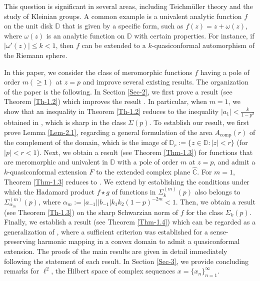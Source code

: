 \documentclass[a4paper,12pt]{amsart}
\theoremstyle{plain}
\theoremstyle{definition}
\begin{document}
This question is significant in several areas, including Teichm\"uller theory and the study of Kleinian groups. A common example is a univalent analytic function $f$ on the unit disk $\mathbb{D}$ that is given by a specific form, such as $f(z) = z + \omega(z)$, where $\omega(z)$ is an analytic function on $\mathbb{D}$ with certain properties. For instance, if $|\omega'(z)| \leq k < 1$, then $f$ can be extended to a $k$-quasiconformal automorphism of the Riemann sphere.\vspace{1.2mm}

In this paper, we consider the class of meromorphic functions $f$ having a pole of order $m(\geq 1)$ at $z=p$ and improve several existing results. The organization of the paper is the following. In Section \ref{Sec-2}, we first prove a result (see Theorem \ref{Th-1.2}) which improves the result \cite[Theorem 1]{Bhowmik-PAMS-2016}. In particular, when $m=1$, we show that an inequality in Theorem \ref{Th-1.2} reduces to the inequality $|a_{1}|<\frac{k}{1-p^{2}}$ obtained in \cite[Corollary 1]{Bhowmik-PAMS-2016}, which is sharp in the class $\Sigma(p)$. To establish our result, we first prove Lemma \ref{Lem-2.1}, regarding a general formulation of the area $A_{\text{comp}}(r)$ of the complement of the domain, which is the image of $\mathbb{D}_r:=\{z\in\mathbb{D} : |z|<r\}$ (for $|p|<r<1$). Next, we obtain a result (see Theorem \ref{Thm-1.3}) for functions that are meromorphic and univalent in $\mathbb{D}$ with a pole of order $m$ at $z = p$, and admit a $k$-quasiconformal extension $F$ to the extended complex plane $\widehat{\mathbb{C}}$. For $m=1$, Theorem \ref{Thm-1.3} reduces to \cite[Theorem 2]{Bhowmik-PAMS-2016}. We extend \cite[Theorem 3]{Bhowmik-PAMS-2016} by establishing the conditions under which the Hadamard product $f \star g$ of functions in $\Sigma^{(m)}_{k}(p)$ also belongs to $\Sigma^{(m)}_{\alpha_m}(p)$, where $\alpha_m:=|a_{-1}||b_{-1}|{k_1k_2}{(1-p)^{-2m}}<1$. Then, we obtain a result (see Theorem \ref{Th-1.3}) on the sharp Schwarzian norm of $f$ for the class $\Sigma_k(p)$. Finally, we establish a result (see Theorem \ref{Thm-1.4}) which can be regarded as a generalization of \cite[Theorem 1]{Bhowmik-Satapati-Complex Sgn-2024}, where a sufficient criterion was established for a sense-preserving harmonic mapping in a convex domain to admit a quasiconformal extension. The proofs of the main results are given in detail immediately following the statement of each result. In Section \ref{Sec-3}, we provide concluding remarks for $\ell^{2}$, the Hilbert space of complex sequences $x=\{x_{n}\}_{n=1}^{\infty}$.
\end{document}
